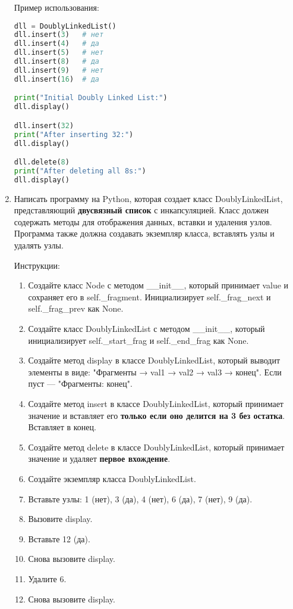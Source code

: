 \begin{enumerate}
Пример использования:
\begin{lstlisting}[language=Python]
dll = DoublyLinkedList()
dll.insert(3)   # нет
dll.insert(4)   # да
dll.insert(5)   # нет
dll.insert(8)   # да
dll.insert(9)   # нет
dll.insert(16)  # да

print("Initial Doubly Linked List:")
dll.display()

dll.insert(32)
print("After inserting 32:")
dll.display()

dll.delete(8)
print("After deleting all 8s:")
dll.display()
\end{lstlisting}

\item Написать программу на Python, которая создает класс DoublyLinkedList, представляющий \textbf{двусвязный список} с инкапсуляцией. Класс должен содержать методы для отображения данных, вставки и удаления узлов. Программа также должна создавать экземпляр класса, вставлять узлы и удалять узлы.

Инструкции:
\begin{enumerate}
    \item Создайте класс Node с методом \_\_init\_\_, который принимает value и сохраняет его в self.\_fragment. Инициализирует self.\_frag\_next и self.\_frag\_prev как None.
    \item Создайте класс DoublyLinkedList с методом \_\_init\_\_, который инициализирует self.\_start\_frag и self.\_end\_frag как None.
    \item Создайте метод display в классе DoublyLinkedList, который выводит элементы в виде: "Фрагменты → val1 → val2 → val3 → конец". Если пуст — "Фрагменты: конец".
    \item Создайте метод insert в классе DoublyLinkedList, который принимает значение и вставляет его \textbf{только если оно делится на 3 без остатка}. Вставляет в конец.
    \item Создайте метод delete в классе DoublyLinkedList, который принимает значение и удаляет \textbf{первое вхождение}.
    \item Создайте экземпляр класса DoublyLinkedList.
    \item Вставьте узлы: 1 (нет), 3 (да), 4 (нет), 6 (да), 7 (нет), 9 (да).
    \item Вызовите display.
    \item Вставьте 12 (да).
    \item Снова вызовите display.
    \item Удалите 6.
    \item Снова вызовите display.
\end{enumerate}


\end{enumerate}
